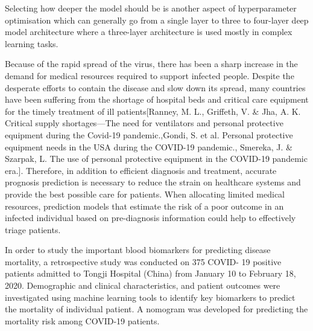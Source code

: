Selecting how deeper the model should be is another aspect of hyperparameter optimisation which can generally go from a single layer to three to four-layer deep model architecture where a three-layer architecture is used mostly in complex learning tasks. 

Because of the rapid spread of the virus, there has been a sharp increase in the demand for medical resources required to support infected people. Despite the desperate efforts to contain the disease and slow down its spread, many countries have been suffering from the shortage of hospital beds and critical care equipment for the timely treatment of ill patients[Ranney, M. L., Griffeth, V. & Jha, A. K. Critical supply shortages—The need for ventilators and personal protective equipment during the Covid-19 pandemic.,Gondi, S. et al. Personal protective equipment needs in the USA during the COVID-19 pandemic., Smereka, J. & Szarpak, L. The use of personal protective equipment in the COVID-19 pandemic era.]. Therefore, in addition to efficient diagnosis and treatment, accurate prognosis prediction is necessary to reduce the strain on healthcare systems and provide the best possible care for patients. When allocating limited medical resources, prediction models that estimate the risk of a poor outcome in an infected individual based on pre-diagnosis information could help to effectively triage patients.

In order to study the important blood biomarkers for predicting disease mortality, a retrospective study was conducted on 375 COVID- 19 positive patients admitted to Tongji Hospital (China) from January 10 to February 18, 2020. Demographic and clinical characteristics, and patient outcomes were investigated using machine learning tools to identify key biomarkers to predict the mortality of individual patient. A nomogram was developed for predicting the mortality risk among COVID-19 patients.

